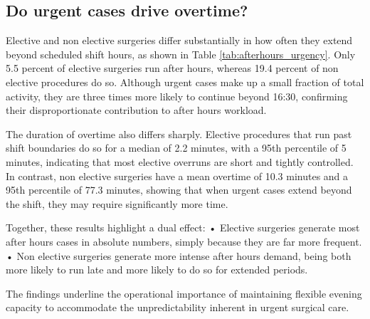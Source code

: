 \documentclass[
]{article}
\begin{document}
\subsection{Do urgent cases drive
overtime?}\label{do-urgent-cases-drive-overtime}

Elective and non elective surgeries differ substantially in how often
they extend beyond scheduled shift hours, as shown in Table
\ref{tab:afterhours_urgency}. Only 5.5 percent of elective surgeries run
after hours, whereas 19.4 percent of non elective procedures do so.
Although urgent cases make up a small fraction of total activity, they
are three times more likely to continue beyond 16:30, confirming their
disproportionate contribution to after hours workload.

The duration of overtime also differs sharply. Elective procedures that
run past shift boundaries do so for a median of 2.2 minutes, with a 95th
percentile of 5 minutes, indicating that most elective overruns are
short and tightly controlled. In contrast, non elective surgeries have a
mean overtime of 10.3 minutes and a 95th percentile of 77.3 minutes,
showing that when urgent cases extend beyond the shift, they may require
significantly more time.

Together, these results highlight a dual effect: • Elective surgeries
generate most after hours cases in absolute numbers, simply because they
are far more frequent. • Non elective surgeries generate more intense
after hours demand, being both more likely to run late and more likely
to do so for extended periods.

The findings underline the operational importance of maintaining
flexible evening capacity to accommodate the unpredictability inherent
in urgent surgical care.
\end{document}
